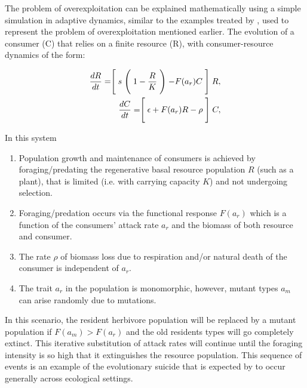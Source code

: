 \documentclass[a4paper]{report}
\begin{document}
The problem of overexploitation can be explained mathematically using a simple simulation in adaptive dynamics, similar to the examples treated by \citep{Johansson2013}, used to represent the problem of overexploitation mentioned earlier. The evolution of a consumer (C) that relies on a finite resource (R), with consumer-resource dynamics of the form:

\begin{sub-equations}
  \label{eq:LV11}
  \begin{align}
    \frac{dR}{dt}=\Biggm[ s \Biggm( 1-\frac{R}{K} \Biggm)-F(a_r)C \Biggm] R
\label{eq:LV_consumer11},\\
    \frac{dC}{dt}=\Biggm[ \epsilon+ F(a_r)R-\rho \Biggm] C,\label{eq:LV_resource11}
  \end{align}
\end{sub-equations}

In this system \\

\begin{enumerate}

\item Population growth and maintenance of consumers is achieved by foraging/predating the regenerative basal resource population $R$ (such as a plant), that is limited (i.e. with carrying capacity $K$) and not undergoing selection.

\item Foraging/predation occurs via the functional response $F(a_r)$ which is a function of the consumers' attack rate $a_r$ and the biomass of both resource and consumer.

\item The rate $\rho$ of biomass loss due to respiration and/or natural death of the consumer is independent of $a_r$.

\item The trait $a_r$ in the population is monomorphic, however, mutant types $a_m$ can arise randomly due to mutations.

\end{enumerate}

In this scenario, the resident herbivore population will be replaced by a mutant population if $F(a_m) > F(a_r)$ and the old residents types will go completely extinct. This iterative substitution of attack rates will continue until the foraging intensity is so high that it extinguishes the resource population. This sequence of events is an example of the evolutionary suicide that is expected by \citep{Ferr2004} to occur generally across ecological settings.  \\
\end{document}
